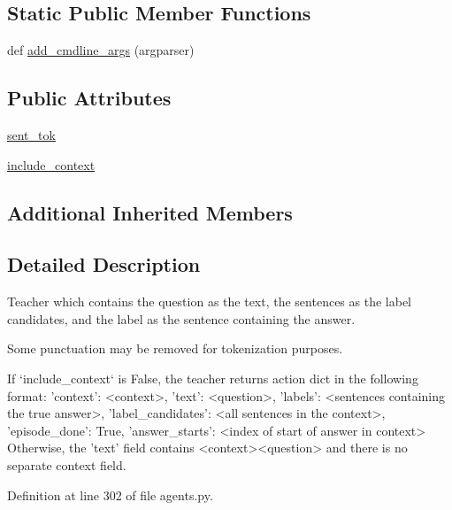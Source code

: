 \subsection*{Static Public Member Functions}
\begin{DoxyCompactItemize}
\item 
def \hyperlink{classparlai_1_1tasks_1_1squad_1_1agents_1_1FulldocsentenceTeacher_af4fae24533376a66d54c771b6c8d06b7}{add\+\_\+cmdline\+\_\+args} (argparser)
\end{DoxyCompactItemize}
\subsection*{Public Attributes}
\begin{DoxyCompactItemize}
\item 
\hyperlink{classparlai_1_1tasks_1_1squad_1_1agents_1_1FulldocsentenceTeacher_a3ad4365c2ebc8896e90e8b478eeb68ed}{sent\+\_\+tok}
\item 
\hyperlink{classparlai_1_1tasks_1_1squad_1_1agents_1_1FulldocsentenceTeacher_a1861bd0d07fa2488073e0292513187dc}{include\+\_\+context}
\end{DoxyCompactItemize}
\subsection*{Additional Inherited Members}


\subsection{Detailed Description}
\begin{DoxyVerb}Teacher which contains the question as the text, the sentences as the label
candidates, and the label as the sentence containing the answer.

Some punctuation may be removed for tokenization purposes.

If `include_context` is False, the teacher returns action dict in the
following format:
{
    'context': <context>,
    'text': <question>,
    'labels': <sentences containing the true answer>,
    'label_candidates': <all sentences in the context>,
    'episode_done': True,
    'answer_starts': <index of start of answer in context>
}
Otherwise, the 'text' field contains <context>\n<question> and there is
no separate context field.
\end{DoxyVerb}
 

Definition at line 302 of file agents.\+py.



